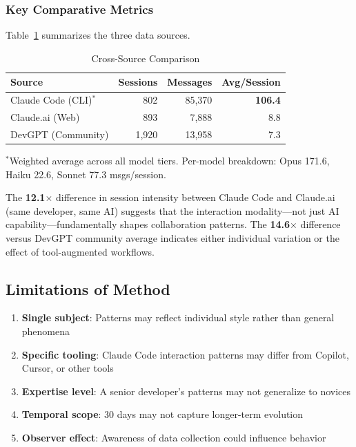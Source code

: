 \documentclass{ntlabs-preprint}
\begin{document}
\subsubsection{Key Comparative Metrics}

Table~\ref{tab:comparison} summarizes the three data sources.

\begin{table}[h]
\centering
\caption{Cross-Source Comparison}
\label{tab:comparison}
\begin{tabular}{lrrr}
\toprule
\textbf{Source} & \textbf{Sessions} & \textbf{Messages} & \textbf{Avg/Session} \\
\midrule
Claude Code (CLI)$^*$ & 802 & 85,370 & \textbf{106.4} \\
Claude.ai (Web) & 893 & 7,888 & 8.8 \\
DevGPT (Community) & 1,920 & 13,958 & 7.3 \\
\bottomrule
\end{tabular}
\smallskip
\footnotesize{$^*$Weighted average across all model tiers. Per-model breakdown: Opus 171.6, Haiku 22.6, Sonnet 77.3 msgs/session.}
\end{table}

The \textbf{12.1$\times$} difference in session intensity between Claude Code and Claude.ai (same developer, same AI) suggests that the interaction modality---not just AI capability---fundamentally shapes collaboration patterns. The \textbf{14.6$\times$} difference versus DevGPT community average indicates either individual variation or the effect of tool-augmented workflows.

\subsection{Limitations of Method}

\begin{enumerate}
    \item \textbf{Single subject}: Patterns may reflect individual style rather than general phenomena
    \item \textbf{Specific tooling}: Claude Code interaction patterns may differ from Copilot, Cursor, or other tools
    \item \textbf{Expertise level}: A senior developer's patterns may not generalize to novices
    \item \textbf{Temporal scope}: 30 days may not capture longer-term evolution
    \item \textbf{Observer effect}: Awareness of data collection could influence behavior
\end{enumerate}
\end{document}
